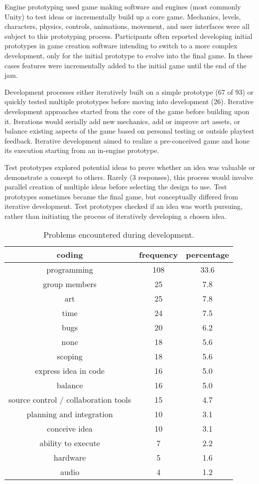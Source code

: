 \documentclass{sig-alternate}
\begin{document}
Engine prototyping used game making software and engines (most commonly Unity) to test ideas or incrementally build up a core game. Mechanics, levels, characters, physics, controls, animations, movement, and user interfaces were all subject to this prototyping process. 
Participants often reported developing initial prototypes in game creation software intending to switch to a more complex development, only for the initial prototype to evolve into the final game. In these cases features were incrementally added to the initial game until the end of the jam.

Development processes either iteratively built on a simple prototype (67 of 93) or quickly tested multiple prototypes before moving into development (26).
Iterative development approaches started from the core of the game before building upon it. Iterations would serially add new mechanics, add or improve art assets, or balance existing aspects of the game based on personal testing or outside playtest feedback.
Iterative development aimed to realize a pre-conceived game and hone its execution starting from an in-engine prototype.

Test prototypes explored potential ideas to prove whether an idea was valuable or demonstrate a concept to others. Rarely (3 responses), this process would involve parallel creation of multiple ideas before selecting the design to use. 
Test prototypes sometimes became the final game, but conceptually differed from iterative development. 
Test prototypes checked if an idea was worth pursuing, rather than initiating the process of iteratively developing a chosen idea.


\begin{table}[tb]
\centering
\scriptsize
\begin{tabular}{|c|c|c|}
\hline coding & frequency & percentage \\ 
\hline programming & 108 & 33.6 \\ 
\hline group members & 25 & 7.8 \\ 
\hline art & 25 & 7.8 \\ 
\hline time & 24 & 7.5 \\ 
\hline bugs & 20 & 6.2 \\ 
\hline none & 18 & 5.6 \\ 
\hline scoping & 18 & 5.6 \\ 
\hline express idea in code & 16 & 5.0 \\ 
\hline balance & 16 & 5.0 \\ 
\hline source control / collaboration tools & 15 & 4.7 \\ 
\hline planning and integration & 10 & 3.1 \\ 
\hline conceive idea & 10 & 3.1 \\ 
\hline ability to execute & 7 & 2.2 \\ 
\hline hardware & 5 & 1.6 \\ 
\hline audio & 4 & 1.2 \\
\hline 
\end{tabular}
\caption{Problems encountered during development.}
\label{tab:problem}
\end{table}
\end{document}
